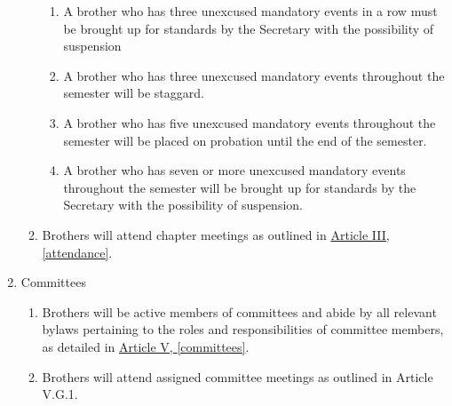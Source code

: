 \begin{enumerate}
\begin{enumerate}
\begin{enumerate}
						\item A brother who has three unexcused mandatory events in a row must be brought up for standards by the Secretary with the possibility of suspension

						\item A brother who has three unexcused mandatory events throughout the semester will be staggard.

						\item A brother who has five unexcused mandatory events throughout the semester will be placed on probation until the end of the semester.

						\item A brother who has seven or more unexcused mandatory events throughout the semester will be brought up for standards by the Secretary with the possibility of suspension.
					\end{enumerate}

				\item Brothers will attend chapter meetings as outlined in \hyperref[attendance]{Article III, \autoref*{attendance}}.
			\end{enumerate}

		\item Committees
			\begin{enumerate}
				\item Brothers will be active members of committees and abide by all relevant bylaws pertaining to the roles and responsibilities of committee members, as detailed in \hyperref[committees]{Article V, \autoref*{committees}}.
				\item Brothers will attend assigned committee meetings as outlined in Article V.G.1.
			\end{enumerate}

	\end{enumerate}
